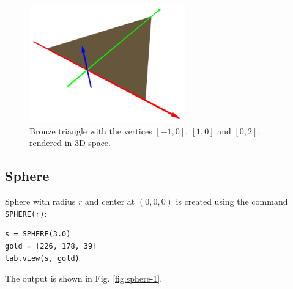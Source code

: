 \begin{figure}[!ht]
\begin{center}
\includegraphics[width=0.6\textwidth]{img/tria-112.png}
\end{center}
\vspace{-4mm}
\caption{Bronze triangle with the vertices $[-1, 0]$, $[1, 0]$ and $[0, 2]$, rendered in 3D space.}
\label{fig:tria-112}
\end{figure}
\noindent

\subsection{Sphere}

Sphere with radius $r$ and center at $(0, 0, 0)$ is created using the command 
{\tt SPHERE(r)}:\\

\begin{bbox}
\begin{verbatim}
s = SPHERE(3.0)
gold = [226, 178, 39]
lab.view(s, gold)
\end{verbatim}
\end{bbox}
\vspace{6mm}

\noindent
The output is shown in Fig. \ref{fig:sphere-1}.

